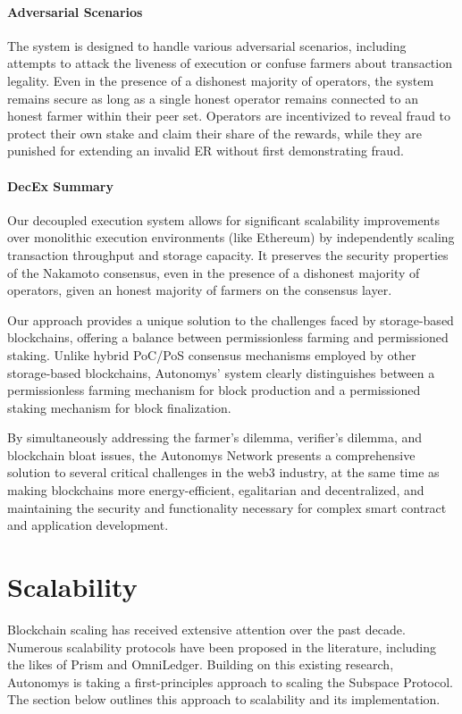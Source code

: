 \documentclass[conference]{IEEEtran}
\begin{document}
\paragraph{Adversarial Scenarios}

The system is designed to handle various adversarial scenarios, including attempts to attack the liveness of execution or confuse farmers about transaction legality. Even in the presence of a dishonest majority of operators, the system remains secure as long as a single honest operator remains connected to an honest farmer within their peer set. Operators are incentivized to reveal fraud to protect their own stake and claim their share of the rewards, while they are punished for extending an invalid ER without first demonstrating fraud.

\paragraph{DecEx Summary}

Our decoupled execution system allows for significant scalability improvements over monolithic execution environments (like Ethereum) by independently scaling transaction throughput and storage capacity. It preserves the security properties of the Nakamoto consensus, even in the presence of a dishonest majority of operators, given an honest majority of farmers on the consensus layer.

Our approach provides a unique solution to the challenges faced by storage-based blockchains, offering a balance between permissionless farming and permissioned staking. Unlike hybrid PoC/PoS consensus mechanisms employed by other storage-based blockchains, Autonomys' system clearly distinguishes between a permissionless farming mechanism for block production and a permissioned staking mechanism for block finalization.

By simultaneously addressing the farmer's dilemma, verifier's dilemma, and blockchain bloat issues, the Autonomys Network presents a comprehensive solution to several critical challenges in the web3 industry, at the same time as making blockchains more energy-efficient, egalitarian and decentralized, and maintaining the security and functionality necessary for complex smart contract and application development.

\section{Scalability}
\label{sec:scalability}
Blockchain scaling has received extensive attention over the past decade. Numerous scalability protocols have been proposed in the literature, including the likes of Prism \cite{bagaria2019prism} and OmniLedger\cite{omniledger}. Building on this existing research, Autonomys is taking a first-principles approach to scaling the Subspace Protocol. The section below outlines this approach to scalability and its implementation.
\end{document}
